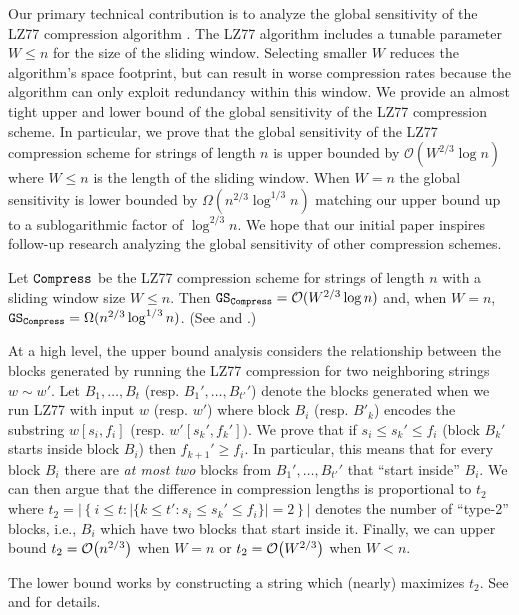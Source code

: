Our primary technical contribution is to analyze the global sensitivity of the  LZ77 compression algorithm \cite{LZ77}. The LZ77 algorithm includes a tunable parameter $W \leq n$ for the size of the sliding window. Selecting smaller $W$ reduces the algorithm's space footprint, but can result in worse compression rates because the algorithm can only exploit redundancy within this window. We provide an almost tight upper and lower bound of the global sensitivity of the LZ77 compression scheme. In particular, we prove that the global sensitivity of the LZ77 compression scheme for strings of length $n$ is upper bounded by $\mathcal{O}(W^{2/3}\log n)$ where $W \leq n$ is the length of the sliding window. When $W=n$ the global sensitivity is lower bounded by $\Omega(n^{2/3}\log^{1/3}n)$ matching our upper bound up to a sublogarithmic factor of $\log^{2/3}n$. We hope that our initial paper inspires follow-up research analyzing the global sensitivity of other compression schemes. 

\begin{theorem}[informal]
Let $\mathtt{Compress}$ be the LZ77 compression scheme for strings of length $n$ with a sliding window size $W \leq n$. Then $\mathtt{GS}_{\mathtt{Compress}} = \mathcal{O}(W^{2/3}\log n)$ and, when $W=n$, $\mathtt{GS}_{\mathtt{Compress}} = \Omega(n^{2/3}\log^{1/3}n)$. (See  and .)
\end{theorem}

At a high level, the upper bound analysis considers the relationship between the blocks generated by running the LZ77  compression for two neighboring strings $w \sim w'$. Let $B_1,\ldots, B_t$ (resp. $B_1',\ldots, B_{t'}'$) denote the blocks generated when we run LZ77 with input $w$ (resp. $w'$) where block $B_i$ (resp. $B'_k$) encodes the substring $w[s_i, f_i]$ (resp. $w'[s_k',f_k'])$. We prove that if $s_i \leq s_k' \leq f_i$ (block $B_k'$ starts inside block $B_i$) then $f_{k+1}' \geq f_i$. In particular, this means that for every block $B_i$ there are \emph{at most two} blocks from $B_1',\ldots, B_{t'}'$ that ``start inside'' $B_i$. We can then argue that the difference in compression lengths is proportional to $t_2$ where $t_2 = \left| \left\{ i \leq t: \left|\{ k\leq t': s_i \leq s_k' \leq f_i  \}\right| =2\right\} \right|$ denotes the number of ``type-2'' blocks, i.e., $B_i$ which have two blocks that start inside it. Finally, we can upper bound $t_2 = \O{n^{2/3}}$ when $W=n$ or $t_2 = \O{W^{2/3}}$ when $W < n$. 

The lower bound works by constructing a string which (nearly) maximizes $t_2$. See  and  for details.

